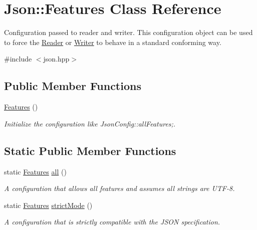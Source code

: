 \hypertarget{class_json_1_1_features}{\section{Json\-:\-:Features Class Reference}
\label{class_json_1_1_features}
}


Configuration passed to reader and writer. This configuration object can be used to force the \hyperlink{class_json_1_1_reader}{Reader} or \hyperlink{class_json_1_1_writer}{Writer} to behave in a standard conforming way.  




{\ttfamily \#include $<$json.\-hpp$>$}

\subsection*{Public Member Functions}
\begin{DoxyCompactItemize}
\item 
\hyperlink{class_json_1_1_features_ad15a091cb61bb31323299a95970d2644}{Features} ()
\begin{DoxyCompactList}\small\item\em Initialize the configuration like Json\-Config\-::all\-Features;. \end{DoxyCompactList}\end{DoxyCompactItemize}
\subsection*{Static Public Member Functions}
\begin{DoxyCompactItemize}
\item 
static \hyperlink{class_json_1_1_features}{Features} \hyperlink{class_json_1_1_features_a63894da6e2c100b38741fa933f3d33ae}{all} ()
\begin{DoxyCompactList}\small\item\em A configuration that allows all features and assumes all strings are U\-T\-F-\/8. \end{DoxyCompactList}\item 
static \hyperlink{class_json_1_1_features}{Features} \hyperlink{class_json_1_1_features_ae23176c14b2e79e81fb61fb1a8ab58ee}{strict\-Mode} ()
\begin{DoxyCompactList}\small\item\em A configuration that is strictly compatible with the J\-S\-O\-N specification. \end{DoxyCompactList}\end{DoxyCompactItemize}

